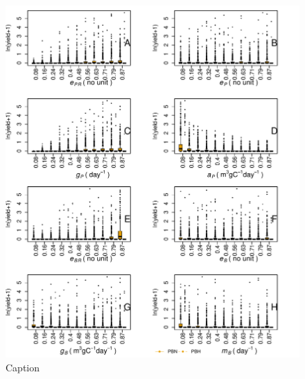 \documentclass[../thesis.tex]{subfiles} %
\begin{document}
\begin{figure}[H]
    \centering
    \includegraphics[width=\linewidth]{result/harvB.pdf}
    \caption[]{Caption}
    \label{f:harvPB}
\end{figure}

\end{document}
